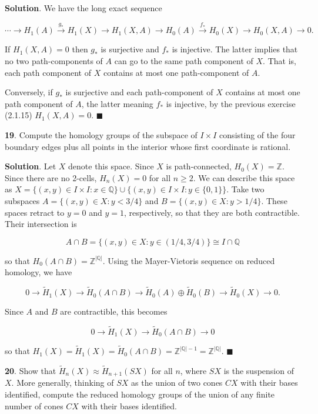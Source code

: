 \documentclass{article}
\newcommand{\Z}{\mathbb{Z}}
\newcommand{\Q}{\mathbb{Q}}
\begin{document}
\textbf{Solution}. We have the long exact sequence

$$\cdots \to H_{1}(A)\xrightarrow{g_{\ast}} H_{1}(X)\to H_{1}(X, A)\to H_{0}(A)\xrightarrow{f_{\ast}} H_{0}(X)\to H_{0}(X, A)\to 0.$$

If $H_{1}(X, A) = 0$ then $g_{\ast}$ is surjective and $f_{\ast}$ is injective. The latter implies that no two path-components of $A$ can go to the same path component of $X$. That is, each path component of $X$ contains at most one path-component of $A$.
\medskip

Conversely, if $g_{\ast}$ is surjective and each path-component of $X$ contains at most one path component of $A$, the latter meaning $f_{\ast}$ is injective, by the previous exercise (2.1.15) $H_{1}(X, A) = 0$. $\blacksquare$
\bigskip
\bigskip

\textbf{19}. Compute the homology groups of the subspace of $I\times I$ consisting of the four boundary edges plus all points in the interior whose first coordinate is rational.
\medskip

\textbf{Solution}. Let $X$ denote this space. Since $X$ is path-connected, $H_{0}(X) = \Z$. Since there are no 2-cells, $H_{n}(X) = 0$ for all $n\geq 2$. We can describe this space as $X = \{(x, y)\in I\times I: x\in \Q\}\cup \{(x, y)\in I\times I: y\in \{0, 1\}\}$. Take two subspaces $A = \{(x, y)\in X: y < 3/4\}$ and $B = \{(x, y)\in X: y > 1/4\}$. These spaces retract to $y = 0$ and $y = 1$, respectively, so that they are both contractible. Their intersection is

$$A\cap B = \{(x, y)\in X: y\in (1/4, 3/4)\}\cong I\cap \Q$$

so that $H_{0}(A\cap B) = \Z^{|\Q|}$. Using the Mayer-Vietoris sequence on reduced homology, we have

$$0\to \tilde{H}_{1}(X)\to \tilde{H}_{0}(A\cap B)\to \tilde{H}_{0}(A)\oplus \tilde{H}_{0}(B)\to \tilde{H}_{0}(X)\to 0.$$

Since $A$ and $B$ are contractible, this becomes

$$0\to \tilde{H}_{1}(X)\to \tilde{H}_{0}(A\cap B)\to  0$$

so that $H_{1}(X) = \tilde{H}_{1}(X) = \tilde{H}_{0}(A\cap B) = \Z^{|\Q|-1} = \Z^{|\Q|}$. $\blacksquare$
\bigskip
\bigskip

\textbf{20}. Show that $\tilde{H}_{n}(X)\approx \tilde{H}_{n+1}(SX)$ for all $n$, where $SX$ is the suspension of $X$. More generally, thinking of $SX$ as the union of two cones $CX$ with their bases identified, compute the reduced homology groups of the union of any finite number of cones $CX$ with their bases identified.
\medskip
\end{document}

